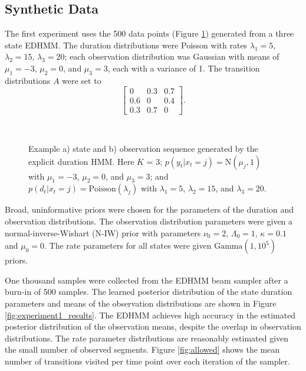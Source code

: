 \subsection{Synthetic Data}

The first experiment uses the 500 data points (Figure \ref{fig:experiment1_data}) generated from a three state EDHMM. The duration distributions were Poisson with rates $\lambda_1 = 5$, $\lambda_2 = 15$, $\lambda_3 = 20$; each observation distribution was Gaussian with means of $\mu_1 = -3$, $\mu_2 = 0$, and $\mu_3 = 3$, each with a variance of 1. The transition distributions $A$ were set to
\begin{equation*}
\begin{bmatrix}
    0 & 0.3 & 0.7 \\ 0.6 & 0 & 0.4 \\ 0.3 & 0.7 & 0
\end{bmatrix}.  
\end{equation*}

\begin{figure}
     \\
    \caption{Example a) state and b) observation sequence generated by the explicit duration HMM. Here $K$ = 3; $p(y_t|x_t=j) = \mathrm{N}(\mu_j, 1)$ with $\mu_1 = -3$, $\mu_2 = 0$, and $\mu_3 = 3$; and $p(d_t|x_t=j) = \mathrm{Poisson}(\lambda_j)$ with $\lambda_1 = 5$, $\lambda_2 = 15$, and $\lambda_3 = 20$.}
    \label{fig:experiment1_data}
\end{figure}

Broad, uninformative priors were chosen for the parameters of the duration and observation distributions. The observation distribution parameters were given a normal-inverse-Wishart (N-IW) prior with parameters $\nu_0 = 2$, $\Lambda_0 = 1$, $\kappa=0.1$ and $\mu_0 = 0$. The rate parameters for all states were given $\mathrm{Gamma}(1, 10^{5})$ priors. 

One thousand samples were collected from the EDHMM beam sampler after a burn-in of 500 samples. The learned posterior distribution of the state duration parameters and means of the observation distributions are shown in Figure \ref{fig:experiment1_results}.  The EDHMM achieves high accuracy in the estimated posterior distribution of the observation means, despite the overlap in observation distributions. The rate parameter distributions are reasonably estimated given the small number of observed segments. Figure \ref{fig:allowed} shows the mean number of transitions visited per time point over each iteration of the sampler. 

